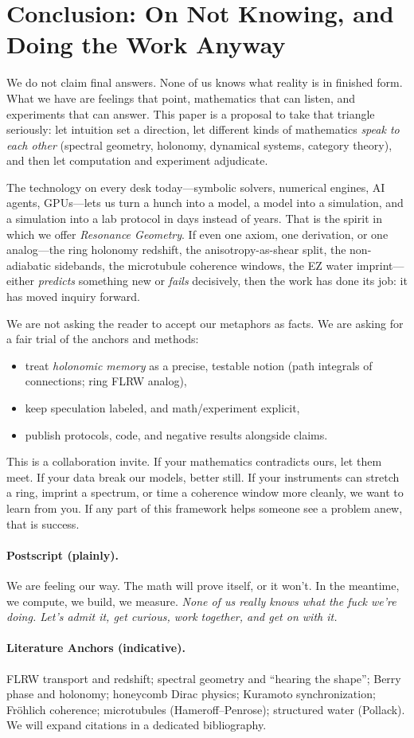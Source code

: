 \documentclass[11pt]{article}
\begin{document}
\section{Conclusion: On Not Knowing, and Doing the Work Anyway}
We do not claim final answers. None of us knows what reality is in finished form.
What we have are feelings that point, mathematics that can listen, and experiments that can answer.
This paper is a proposal to take that triangle seriously: let intuition set a direction,
let different kinds of mathematics \emph{speak to each other} (spectral geometry, holonomy, dynamical systems, category theory),
and then let computation and experiment adjudicate.

The technology on every desk today---symbolic solvers, numerical engines, AI agents, GPUs---lets us turn
a hunch into a model, a model into a simulation, and a simulation into a lab protocol in days instead of years.
That is the spirit in which we offer \emph{Resonance Geometry}.
If even one axiom, one derivation, or one analog---the ring holonomy redshift, the anisotropy-as-shear split,
the non-adiabatic sidebands, the microtubule coherence windows, the EZ water imprint---either
\emph{predicts} something new or \emph{fails} decisively, then the work has done its job:
it has moved inquiry forward.

We are not asking the reader to accept our metaphors as facts.
We are asking for a fair trial of the anchors and methods:
\begin{itemize}
  \item treat \emph{holonomic memory} as a precise, testable notion (path integrals of connections; ring FLRW analog),
  \item keep speculation labeled, and math/experiment explicit,
  \item publish protocols, code, and negative results alongside claims.
\end{itemize}

This is a collaboration invite. If your mathematics contradicts ours, let them meet.
If your data break our models, better still. If your instruments can stretch a ring,
imprint a spectrum, or time a coherence window more cleanly, we want to learn from you.
If any part of this framework helps someone see a problem anew, that is success.

\paragraph*{Postscript (plainly).}
We are feeling our way. The math will prove itself, or it won’t. In the meantime, we compute, we build, we measure.
\emph{None of us really knows what the fuck we’re doing. Let’s admit it, get curious, work together, and get on with it.}

\paragraph*{Literature Anchors (indicative).}
FLRW transport and redshift; spectral geometry and ``hearing the shape''; Berry phase and holonomy; honeycomb Dirac physics; Kuramoto synchronization; Fr\"ohlich coherence; microtubules (Hameroff--Penrose); structured water (Pollack). We will expand citations in a dedicated bibliography.
\end{document}
